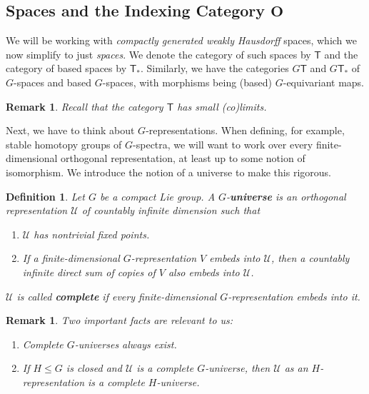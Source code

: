 \documentclass{scrartcl}
\newcommand{\textbi}[1]{\textbf{\textit{#1}}}
\newtheorem{defin}[subsection]{Definition}
\newtheorem{rem}[subsection]{Remark}
\begin{document}
\subsection*{Spaces and the Indexing Category $\mathbf{O}$}

We will be working with \textit{compactly generated weakly Hausdorff} spaces, which we now simplify to just \textit{spaces}. We denote the category of such spaces by $\mathsf{T}$ and the category of based spaces by $\mathsf{T}_*$. Similarly, we have the categories $G\mathsf{T}$ and $G\mathsf{T}_*$ of $G$-spaces and based $G$-spaces, with morphisms being (based) $G$-equivariant maps.
\begin{rem}
    Recall that the category $\mathsf{T}$ has small (co)limits.
\end{rem} 

Next, we have to think about $G$-representations. When defining, for example, stable homotopy groups of $G$-spectra, we will want to work over every finite-dimensional orthogonal representation, at least up to some notion of isomorphism. We introduce the notion of a universe to make this rigorous.

\begin{defin}{\normalfont \cite[1.1.12]{GHT}}
    Let $G$ be a compact Lie group. A $G$-\textbi{universe} is an orthogonal representation $\mathcal{U}$ of countably infinite dimension such that
    \begin{enumerate}
        \item $\mathcal{U}$ has nontrivial fixed points.
        \item If a finite-dimensional $G$-representation $V$ embeds into $\mathcal{U}$, then a countably infinite direct sum of copies of $V$ also embeds into $\mathcal{U}$.
    \end{enumerate}
    $\mathcal{U}$ is called \textbi{complete} if every finite-dimensional $G$-representation embeds into it.
\end{defin}

\begin{rem}
    Two important facts are relevant to us: 
    \begin{enumerate}
        \item Complete $G$-universes always exist.
        \item If $H\leq G$ is closed and $\mathcal{U}$ is a complete $G$-universe, then $\mathcal{U}$ as an $H$-representation is a complete $H$-universe. 
    \end{enumerate}
\end{rem}
\end{document}
